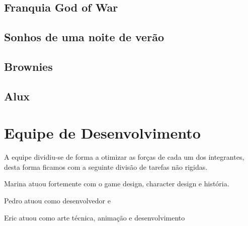 \subsection{Franquia God of War}
\subsection{Sonhos de uma noite de verão}
\subsection{Brownies}
\subsection{Alux}

\section{Equipe de Desenvolvimento}

A equipe dividiu-se de forma a otimizar as forças de cada um dos integrantes, desta forma ficamos com a seguinte divisão de tarefas não rigidas. 

Marina atuou fortemente com o game design, character design e história. 

Pedro atuou como desenvolvedor e 

Eric atuou como arte técnica, animação e desenvolvimento